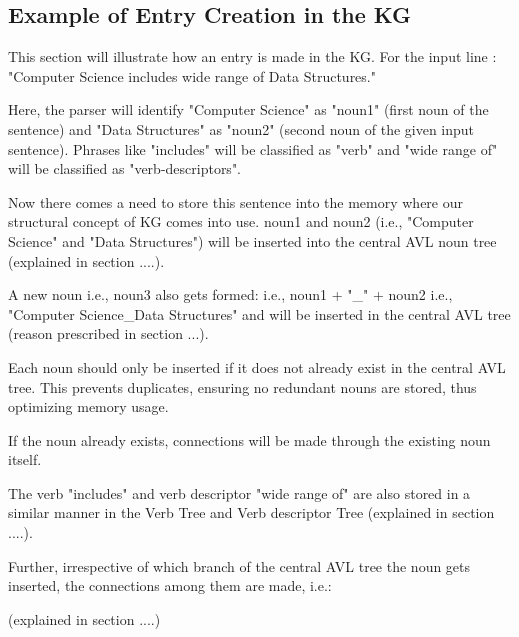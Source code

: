 \documentclass[conference]{IEEEtran}
\begin{document}
\subsection{Example of Entry Creation in the KG}

This section will illustrate how an entry is made in the KG.
For the input line : "Computer Science includes wide range of
Data Structures."

Here, the parser will identify "Computer Science" as "noun1" (first noun of the sentence)
and "Data Structures" as "noun2" (second noun of the given input sentence).
Phrases like "includes" will be classified as "verb" and "wide range of" will be classified as "verb-descriptors".

Now there comes a need to store this sentence into the memory where our structural concept
of KG comes into use.
noun1 and noun2 (i.e., "Computer Science" and "Data Structures") will be inserted into the central AVL noun
tree (explained in section ....).

A new noun i.e., noun3 also gets formed: i.e., noun1 + "\_" + noun2 i.e., "Computer Science\_Data Structures"
and will be inserted in the central AVL tree (reason prescribed in section ...).

Each noun should only be inserted if it does not already exist in the central AVL tree. 
This prevents duplicates, ensuring no redundant nouns are stored, thus optimizing memory usage.

If the noun already exists, connections will be made through the existing noun itself.

The verb "includes" and verb descriptor "wide range of" are also stored in a similar manner
in the Verb Tree and Verb descriptor Tree (explained in section ....).

Further, irrespective of which branch of the central AVL tree the noun gets inserted, 
the connections among them are made, i.e.:


(explained in section ....)
\end{document}
